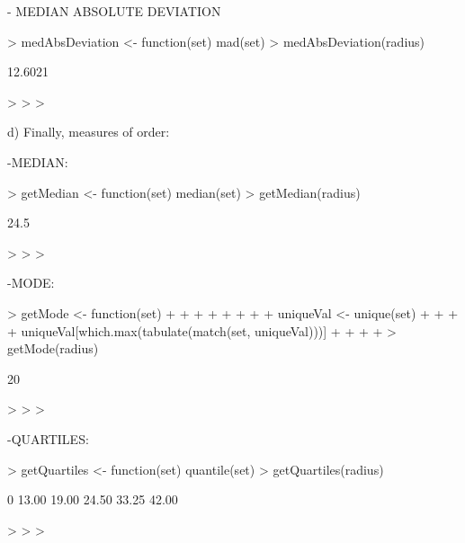 \documentclass[a4paper]{article}
\begin{document}
- MEDIAN ABSOLUTE DEVIATION



\begin{Schunk}
\begin{Sinput}
> medAbsDeviation <- function(set) {mad(set)}
> medAbsDeviation(radius)
\end{Sinput}
\begin{Soutput}
[1] 12.6021
\end{Soutput}
\begin{Sinput}
> 
> 
> 
\end{Sinput}
\end{Schunk}



d) Finally, measures of order:







-MEDIAN:



\begin{Schunk}
\begin{Sinput}
> getMedian <- function(set) {median(set)}
> getMedian(radius)
\end{Sinput}
\begin{Soutput}
[1] 24.5
\end{Soutput}
\begin{Sinput}
> 
> 
> 
\end{Sinput}
\end{Schunk}



-MODE:



\begin{Schunk}
\begin{Sinput}
> getMode <- function(set)
+ 
+ 
+ 
+ {
+ 
+ 
+ 
+ uniqueVal <- unique(set)
+ 
+ 
+ 
+ uniqueVal[which.max(tabulate(match(set, uniqueVal)))]
+ 
+ 
+ 
+ }
> getMode(radius)
\end{Sinput}
\begin{Soutput}
[1] 20
\end{Soutput}
\begin{Sinput}
> 
> 
> 
\end{Sinput}
\end{Schunk}



-QUARTILES:



\begin{Schunk}
\begin{Sinput}
> getQuartiles <- function(set) {quantile(set)}
> getQuartiles(radius)
\end{Sinput}
\begin{Soutput}
   0%   25%   50%   75%  100% 
13.00 19.00 24.50 33.25 42.00 
\end{Soutput}
\begin{Sinput}
> 
> 
> 
\end{Sinput}
\end{Schunk}
\end{document}
